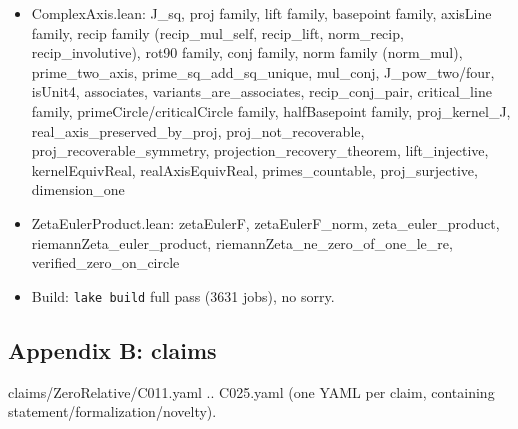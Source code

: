 \documentclass[
]{article}
\providecommand{\tightlist}{%
  \setlength{\itemsep}{0pt}\setlength{\parskip}{0pt}}
\begin{document}
\begin{itemize}
\tightlist
\item
  ComplexAxis.lean: J\_sq, proj family, lift family, basepoint family,
  axisLine family, recip family (recip\_mul\_self, recip\_lift,
  norm\_recip, recip\_involutive), rot90 family, conj family, norm
  family (norm\_mul), prime\_two\_axis, prime\_sq\_add\_sq\_unique,
  mul\_conj, J\_pow\_two/four, isUnit4, associates,
  variants\_are\_associates, recip\_conj\_pair, critical\_line family,
  primeCircle/criticalCircle family, halfBasepoint family,
  proj\_kernel\_J, real\_axis\_preserved\_by\_proj,
  proj\_not\_recoverable, proj\_recoverable\_symmetry,
  projection\_recovery\_theorem, lift\_injective, kernelEquivReal,
  realAxisEquivReal, primes\_countable, proj\_surjective, dimension\_one
\item
  ZetaEulerProduct.lean: zetaEulerF, zetaEulerF\_norm,
  zeta\_euler\_product, riemannZeta\_euler\_product,
  riemannZeta\_ne\_zero\_of\_one\_le\_re, verified\_zero\_on\_circle
\item
  Build: \texttt{lake\ build} full pass (3631 jobs), no sorry.
\end{itemize}

\subsection{Appendix B: claims}\label{appendix-b-claims}

claims/ZeroRelative/C011.yaml .. C025.yaml (one YAML per claim,
containing statement/formalization/novelty).
\end{document}
